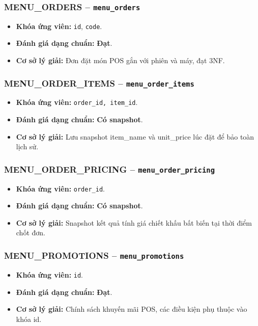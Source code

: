 \subsubsection{MENU_ORDERS -- \texttt{menu\_orders}}
\begin{itemize}
  \item \textbf{Khóa ứng viên:} \texttt{id}, \texttt{code}.
  \item \textbf{Đánh giá dạng chuẩn:} \textbf{Đạt}.
  \item \textbf{Cơ sở lý giải:} Đơn đặt món POS gắn với phiên và máy, đạt 3NF.
\end{itemize}

\subsubsection{MENU_ORDER_ITEMS -- \texttt{menu\_order\_items}}
\begin{itemize}
  \item \textbf{Khóa ứng viên:} \texttt{order\_id, item\_id}.
  \item \textbf{Đánh giá dạng chuẩn:} \textbf{Có snapshot}.
  \item \textbf{Cơ sở lý giải:} Lưu snapshot item_name và unit_price lúc đặt để bảo toàn lịch sử.
\end{itemize}

\subsubsection{MENU_ORDER_PRICING -- \texttt{menu\_order\_pricing}}
\begin{itemize}
  \item \textbf{Khóa ứng viên:} \texttt{order\_id}.
  \item \textbf{Đánh giá dạng chuẩn:} \textbf{Có snapshot}.
  \item \textbf{Cơ sở lý giải:} Snapshot kết quả tính giá chiết khấu bất biến tại thời điểm chốt đơn.
\end{itemize}

\subsubsection{MENU_PROMOTIONS -- \texttt{menu\_promotions}}
\begin{itemize}
  \item \textbf{Khóa ứng viên:} \texttt{id}.
  \item \textbf{Đánh giá dạng chuẩn:} \textbf{Đạt}.
  \item \textbf{Cơ sở lý giải:} Chính sách khuyến mãi POS, các điều kiện phụ thuộc vào khóa id.
\end{itemize}

